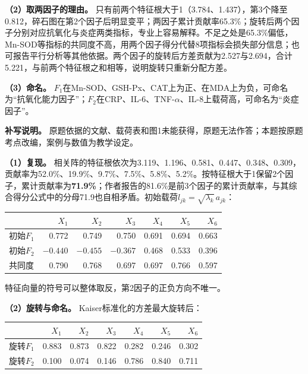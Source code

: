 \textbf{（2）取两因子的理由。} 只有前两个特征根大于1（3.784、1.437），第3个降至0.812，碎石图在第2个因子后明显变平；两因子累计贡献率65.3\%；旋转后两个因子分别对应抗氧化与炎症两类指标，专业上容易解释。不足之处是65.3\%偏低，Mn-SOD等指标的共同度不高，用两个因子得分代替8项指标会损失部分信息；也可报告平行分析等其他依据。两个因子的旋转后方差贡献为2.527与2.694，合计5.221，与前两个特征根之和相等，说明旋转只重新分配方差。

\textbf{（3）命名。} \(F_1\)在Mn-SOD、GSH-Px、CAT上为正、在MDA上为负，可命名为``抗氧化能力因子''；\(F_2\)在CRP、IL-6、TNF-\(\alpha\)、IL-8上载荷高，可命名为``炎症因子''。

\textbf{补写说明。} 原题依据的文献、载荷表和图1未能获得，原题无法作答；本题按原题考点改编，案例与数值为教学设定。



\textbf{（1）复现。} 相关阵的特征根依次为3.119、1.196、0.581、0.447、0.348、0.309，贡献率为52.0\%、19.9\%、9.7\%、7.5\%、5.8\%、5.2\%。按特征根大于1保留2个因子，累计贡献率为\textbf{71.9\%}；作者报告的81.6\%是前3个因子的累计贡献率，与其综合得分公式中的分母71.9也自相矛盾。初始载荷\(l_{jk}=\sqrt{\lambda_k}\,a_{jk}\)：

\begin{center}\small\setlength{\tabcolsep}{6pt}\renewcommand{\arraystretch}{1.18}\begin{tabular}{@{}lrrrrrr@{}}
\toprule
 & \(X_1\) & \(X_2\) & \(X_3\) & \(X_4\) & \(X_5\) & \(X_6\) \\
\midrule
初始\(F_1\) & 0.772 & 0.749 & 0.750 & 0.691 & 0.694 & 0.663 \\
初始\(F_2\) & \(-0.440\) & \(-0.455\) & \(-0.367\) & 0.468 & 0.533 & 0.396 \\
共同度 & 0.790 & 0.768 & 0.697 & 0.697 & 0.766 & 0.597 \\
\bottomrule\end{tabular}\end{center}

特征向量的符号可以整体取反，第2因子的正负方向不唯一。

\textbf{（2）旋转与命名。} Kaiser标准化的方差最大旋转后：

\begin{center}\small\setlength{\tabcolsep}{6pt}\renewcommand{\arraystretch}{1.18}\begin{tabular}{@{}lrrrrrr@{}}
\toprule
 & \(X_1\) & \(X_2\) & \(X_3\) & \(X_4\) & \(X_5\) & \(X_6\) \\
\midrule
旋转\(F_1\) & 0.883 & 0.873 & 0.822 & 0.282 & 0.246 & 0.302 \\
旋转\(F_2\) & 0.100 & 0.074 & 0.146 & 0.786 & 0.840 & 0.711 \\
\bottomrule\end{tabular}\end{center}

